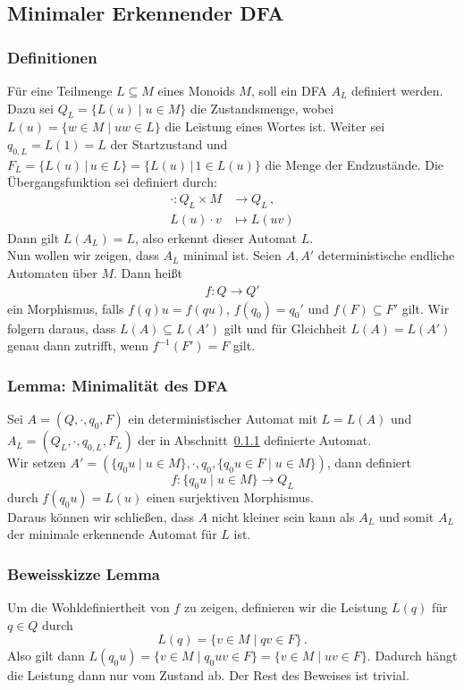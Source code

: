 \documentclass[12pt, german]{article}
\newcommand{\inv}{^{-1}}
\begin{document}
	\subsection{Minimaler Erkennender DFA}
	\subsubsection{Definitionen}
	\label{sec:min_dfa}
	Für eine Teilmenge $L \subseteq M$ eines Monoids $M$, soll ein DFA $A_L$ definiert werden.
	Dazu sei $Q_L = \{L(u) \mid u \in M\}$ die Zustandsmenge, wobei $L(u) = \{ w \in M \mid uw \in L\}$ die Leistung eines Wortes ist. Weiter sei $q_{0,L}=L(1)=L$ der Startzustand und $F_L=\{L(u) \, | \, u \in L\}= \{L(u) \, | \, 1 \in L(u)\}$ die Menge der Endzustände.
	Die Übergangsfunktion sei definiert durch:
	\begin{align*}
		\cdot: Q_L \times M  &\to Q_L\, ,\\
		L(u)\cdot v &\mapsto L(uv)
	\end{align*}
	Dann gilt $L(A_L) = L$, also erkennt dieser Automat $L$.\\
	Nun wollen wir zeigen, dass $A_L$ minimal ist.
	Seien $A, A'$ deterministische endliche Automaten über $M$. Dann hei\ss t 
	\begin{align*}
		f: Q \to Q'
	\end{align*} ein Morphismus, falls $f(q)u=f(qu)$, $f(q_0) = q_0'$ und $f(F) \subseteq F'$ gilt.
	Wir folgern daraus, dass $L(A) \subseteq L(A')$ gilt und für Gleichheit $L(A) = L(A')$ genau dann zutrifft, wenn $f\inv(F') = F$ gilt. 
	
	\subsubsection{Lemma: Minimalität des DFA}
	Sei $A = (Q, \cdot, q_0, F)$ ein deterministischer Automat mit $L = L(A)$ und $A_L = (Q_L, \cdot, q_{0,L}, F_L)$ der in Abschnitt~\ref{sec:min_dfa} definierte Automat.  \\
	
	Wir setzen $A' = (\{q_0u \mid u \in M\}, \cdot, q_0, \{q_0u \in F \mid u \in M\})$, dann definiert $$f: \{q_0u \mid u \in M\} \to Q_L$$ durch $f(q_0u) = L(u)$ einen surjektiven Morphismus.\\
	Daraus können wir schlie\ss en, dass $A$ nicht kleiner sein kann als $A_L$ und somit $A_L$ der minimale erkennende Automat für $L$ ist.
	
	
	\subsubsection{Beweisskizze Lemma}
	Um die Wohldefiniertheit von $f$ zu zeigen, definieren wir die Leistung $L(q)$ für $q \in Q$ durch $$L(q) = \{v \in M \mid qv \in F\}\, .$$ Also gilt dann $L(q_0u) = \{v \in M \mid q_0uv \in F\} = \{v \in M \mid uv \in F\}$.
	Dadurch hängt die Leistung dann nur vom Zustand ab. 
	Der Rest des Beweises ist trivial.
	
\end{document}
